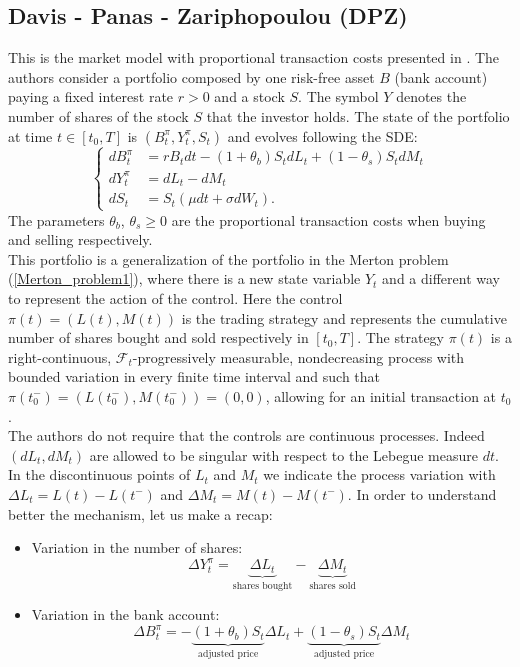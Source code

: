 \subsection{Davis - Panas - Zariphopoulou (DPZ)}\label{DPZ_sec}

This is the market model with proportional transaction costs presented in \cite{DaPaZa93}. 
The authors consider a portfolio composed by one risk-free asset $B$ (bank account) paying a fixed interest rate $r > 0$ and a stock $S$. 
The symbol $Y$ denotes the number of shares of the stock $S$ that the investor holds. 
The state of the portfolio at time $t\in [t_0,T]$ is $(B^{\pi}_t,Y^{\pi}_t,S_t)$ and evolves following the SDE:
\begin{equation}\label{DPZ_porfolio_dynamics}
 \begin{cases}
 dB^{\pi}_t &=  rB_t dt - (1+\theta_b)S_t dL_t + (1-\theta_s) S_t dM_t \\
 dY^{\pi}_t &=  dL_t - dM_t \\
 dS_t &=  S_t \left( \mu dt + \sigma dW_t \right).
\end{cases}
\end{equation} 
The parameters $\theta_b$, $\theta_s \geq 0$ are the proportional transaction costs when buying and selling respectively.\\
This portfolio is a generalization of the portfolio in the Merton problem (\ref{Merton_problem1}), where there is a new state variable $Y_t$ and a different way to represent the 
action of the control. Here the control $\pi(t) = (L(t),M(t))$ is the trading strategy and represents the 
cumulative number of shares bought and sold respectively in $[t_0,T]$.
The strategy $\pi(t)$ is a right-continuous, $\mathcal{F}_t$-progressively measurable, nondecreasing process with bounded variation in every finite time interval and such that
$ \pi(t_0^-) = ( L(t_0^-) , M(t_0^-) ) = (0,0) $, allowing for an initial transaction at $t_0$.\\
The authors do not require that the controls are continuous processes. Indeed $(dL_t,dM_t)$ are allowed to be singular with respect to the Lebegue measure $dt$.
In the discontinuous points of $L_t$ and $M_t$ we indicate the process variation with $\Delta L_t= L(t)-L(t^-)$ and $\Delta M_t= M(t)-M(t^-)$.
In order to understand better the mechanism, let us make a recap:
\begin{itemize}
 \item Variation in the number of shares:
 $$\Delta Y^{\pi}_t =  \underbrace{\Delta L_t}_{\mbox{shares bought}} - \underbrace{\Delta M_t}_{\mbox{shares sold}} $$
 \item Variation in the bank account:
 $$ \Delta B^{\pi}_t =  - \underbrace{(1+\theta_b)S_t}_{\mbox{adjusted price}} \Delta L_t + \underbrace{(1-\theta_s) S_t}_{\mbox{adjusted price}} \Delta M_t $$
\end{itemize}
